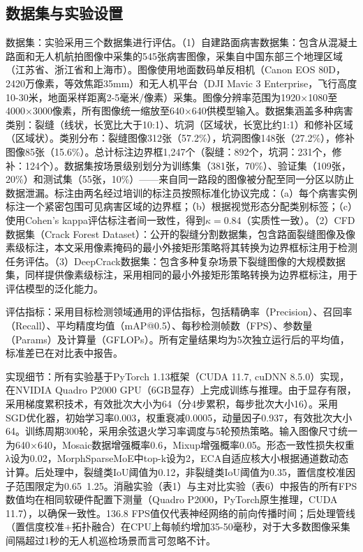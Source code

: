 \documentclass[twocolumn]{sn-jnl}
\begin{document}
	\subsection{数据集与实验设置}
	数据集：实验采用三个数据集进行评估。（1）自建路面病害数据集：包含从混凝土路面和无人机航拍图像中采集的545张病害图像，采集自中国东部三个地理区域（江苏省、浙江省和上海市）。图像使用地面数码单反相机（Canon EOS 80D，2420万像素，等效焦距35mm）和无人机平台（DJI Mavic 3 Enterprise，飞行高度10-30米，地面采样距离2-5毫米/像素）采集。图像分辨率范围为1920×1080至4000×3000像素，所有图像统一缩放至640×640供模型输入。数据集涵盖多种病害类别：裂缝（线状，长宽比大于10:1）、坑洞（区域状，长宽比约1:1）和修补区域（区域状）。类别分布：裂缝图像312张（57.2\%），坑洞图像148张（27.2\%），修补图像85张（15.6\%）。总计标注边界框1,247个（裂缝：892个，坑洞：231个，修补：124个）。数据集按场景级别划分为训练集（381张，70\%）、验证集（109张，20\%）和测试集（55张，10\%）——来自同一路段的图像被分配至同一分区以防止数据泄漏。标注由两名经过培训的标注员按照标准化协议完成：（a）每个病害实例标注一个紧密包围可见病害区域的边界框；（b）根据视觉形态分配类别标签；（c）使用Cohen's kappa评估标注者间一致性，得到$\kappa = 0.84$（实质性一致）。（2）CFD数据集（Crack Forest Dataset）：公开的裂缝分割数据集，包含路面裂缝图像及像素级标注，本文采用像素掩码的最小外接矩形策略将其转换为边界框标注用于检测任务评估。（3）DeepCrack数据集：包含多种复杂场景下裂缝图像的大规模数据集，同样提供像素级标注，采用相同的最小外接矩形策略转换为边界框标注，用于评估模型的泛化能力。
	
	评估指标：采用目标检测领域通用的评估指标，包括精确率（Precision）、召回率（Recall）、平均精度均值（mAP@0.5）、每秒检测帧数（FPS）、参数量（Params）及计算量（GFLOPs）。所有定量结果均为5次独立运行后的平均值，标准差已在对比表中报告。
	
	实现细节：所有实验基于PyTorch 1.13框架（CUDA 11.7, cuDNN 8.5.0）实现，在NVIDIA Quadro P2000 GPU（6GB显存）上完成训练与推理。由于显存有限，采用梯度累积技术，有效批次大小为64（分4步累积，每步批次大小16）。采用SGD优化器，初始学习率0.003，权重衰减0.0005，动量因子0.937，有效批次大小64。训练周期300轮，采用余弦退火学习率调度与5轮预热策略。输入图像尺寸统一为640×640，Mosaic数据增强概率0.6，Mixup增强概率0.05。形态一致性损失权重λ设为0.02，MorphSparseMoE中top-k设为2，ECA自适应核大小根据通道数动态计算。后处理中，裂缝类IoU阈值为0.12，非裂缝类IoU阈值为0.35，置信度校准因子范围限定为0.65~1.25。消融实验（表1）与主对比实验（表6）中报告的所有FPS数值均在相同软硬件配置下测量（Quadro P2000，PyTorch原生推理，CUDA 11.7），以确保一致性。136.8 FPS值仅代表神经网络的前向传播时间；后处理管线（置信度校准+拓扑融合）在CPU上每帧约增加35-50毫秒，对于大多数图像采集间隔超过1秒的无人机巡检场景而言可忽略不计。
	
\end{document}
